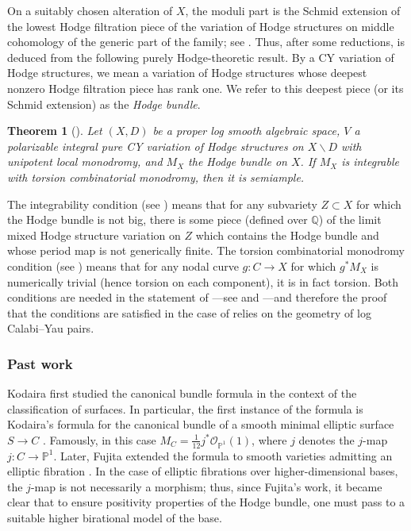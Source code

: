 \documentclass{amsart}
\newcommand{\bs}{\backslash}
\newtheorem{thm}[theorem]{Theorem}
\theoremstyle{definition}
\theoremstyle{remark}
\def\bQ{\mathbb{Q}}
\numberwithin{equation}{section}
\begin{document}
On a suitably chosen alteration of $X$, the moduli part is the Schmid extension of the lowest Hodge filtration piece of the variation of Hodge structures on middle cohomology of the generic part of the family; see .
Thus, after some reductions,  is deduced from the following purely Hodge-theoretic result.  By a CY variation of Hodge structures, we mean a variation of Hodge structures whose deepest nonzero Hodge filtration piece has rank one.  We refer to this deepest piece (or its Schmid extension) as the \emph{Hodge bundle}.
\begin{thm}[]\label{thm:Hodgesemimain}
Let $(X,D)$ be a proper log smooth algebraic space, $V$ a polarizable integral pure CY variation of Hodge structures on $X\bs D$ with unipotent local monodromy, and $M_X$ the Hodge bundle on $X$.  If $ M_X$ is integrable with torsion combinatorial monodromy, then it is semiample. 
\end{thm}

The integrability condition (see ) means that for any subvariety $Z\subset X$ for which the Hodge bundle is not big, there is some piece (defined over $\bQ$) of the limit mixed Hodge structure variation on $Z$ which contains the Hodge bundle and whose period map is not generically finite.  The torsion combinatorial monodromy condition (see ) means that for any nodal curve $g \colon C\to X$ for which $g^*M_X$ is numerically trivial (hence torsion on each component), it is in fact torsion.  Both conditions are needed in the statement of ---see  and ---and therefore the proof that the conditions are satisfied in the case of  relies on the geometry of log Calabi--Yau pairs.


\subsubsection{Past work}



Kodaira first studied the canonical bundle formula in the context of the classification of surfaces.
In particular, the first instance of the formula is Kodaira's formula for the canonical bundle of a smooth minimal elliptic surface $S \to C$ \cite{Kod1,Kod2}.
Famously, in this case 
$M_C = \frac{1}{12} j^* \mathcal{O}_{\mathbb P ^1}(1)$, where $j$ denotes the $j$-map $j \colon C \to \mathbb P ^1$.
Later, Fujita extended the formula to smooth varieties admitting an elliptic fibration \cite{Fuj86}.
In the case of elliptic fibrations over higher-dimensional bases, the $j$-map is not necessarily a morphism;
thus, since Fujita's work, it became clear that to ensure positivity properties of the Hodge bundle, one must pass to a suitable higher birational model of the base.
\end{document}
